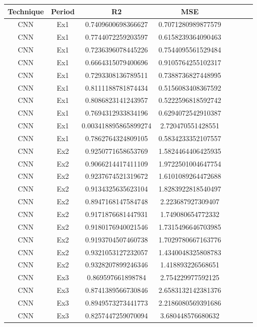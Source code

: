 \begin{appendices}
\begin{table}[H]
\scriptsize
\setlength\extrarowheight{3pt}
\centering
\caption{Resultados numéricos de todos os experimentos para os testes com o CNN. Ações PETR4.SA.}
\begin{longtable}{ccccccll}
\hline
Technique & Period & R2 & MSE \\ \hline
CNN & Ex1 & 0.7409600698366627 & 0.7071280989877579 \\
CNN & Ex1 & 0.7744072259203597 & 0.6158239364090463 \\
CNN & Ex1 & 0.7236396078445226 & 0.7544095561529484 \\
CNN & Ex1 & 0.6664315079400696 & 0.9105764255102317 \\
CNN & Ex1 & 0.7293308136789511 & 0.7388736827448995 \\
CNN & Ex1 & 0.8111188781874434 & 0.5156083408367592 \\
CNN & Ex1 & 0.8086823141243957 & 0.5222596818592742 \\
CNN & Ex1 & 0.7694312933834196 & 0.6294072542910387 \\
CNN & Ex1 & 0.003418895865899274 & 2.720470551428551 \\
CNN & Ex1 & 0.7862764324809105 & 0.5834233352107557 \\
CNN & Ex2 & 0.9250771658653769 & 1.5824464406425935 \\
CNN & Ex2 & 0.9066214417411109 & 1.9722501004647754 \\
CNN & Ex2 & 0.9237674521319672 & 1.6101089264472688 \\
CNN & Ex2 & 0.9134325635623104 & 1.8283922818540497 \\
CNN & Ex2 & 0.8947168147584748 & 2.223687927309407 \\
CNN & Ex2 & 0.9171876681447931 & 1.749080654772332 \\
CNN & Ex2 & 0.9180176940021546 & 1.7315496646703985 \\
CNN & Ex2 & 0.9193704507460738 & 1.7029780667163776 \\
CNN & Ex2 & 0.9321053127232057 & 1.4340048325808783 \\
CNN & Ex2 & 0.9328207899246346 & 1.418893226568651 \\
CNN & Ex3 & 0.869597661898784 & 2.754229977592125 \\
CNN & Ex3 & 0.8741389566730846 & 2.6583132142381376 \\
CNN & Ex3 & 0.8949573273441773 & 2.2186080569391686 \\
CNN & Ex3 & 0.8257447259070094 & 3.680448576680632 \\

\end{longtable}
\end{table}
\end{appendices}
